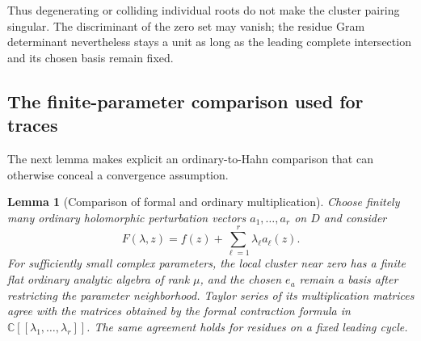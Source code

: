 \documentclass[11pt,letterpaper]{article}
\newtheorem{lemma}[theorem]{Lemma}
\theoremstyle{definition}
\theoremstyle{remark}
\newcommand{\C}{\mathbb C}
\begin{document}
Thus degenerating or colliding individual roots do not make the cluster pairing singular. The discriminant of the zero set may vanish; the residue Gram determinant nevertheless stays a unit as long as the leading complete intersection and its chosen basis remain fixed.

\subsection{The finite-parameter comparison used for traces}
The next lemma makes explicit an ordinary-to-Hahn comparison that can otherwise conceal a convergence assumption.

\begin{lemma}[Comparison of formal and ordinary multiplication]\label{lem:finiteparam}
Choose finitely many ordinary holomorphic perturbation vectors $a_1,\ldots,a_r$ on $D$ and consider
\[
 F(\lambda,z)=f(z)+\sum_{\ell=1}^{r}\lambda_\ell a_\ell(z).
\]
For sufficiently small complex parameters, the local cluster near zero has a finite flat ordinary analytic algebra of rank $\mu$, and the chosen $e_a$ remain a basis after restricting the parameter neighborhood. Taylor series of its multiplication matrices agree with the matrices obtained by the formal contraction formula in $\C[[\lambda_1,\ldots,\lambda_r]]$. The same agreement holds for residues on a fixed leading cycle.
\end{lemma}
\end{document}
